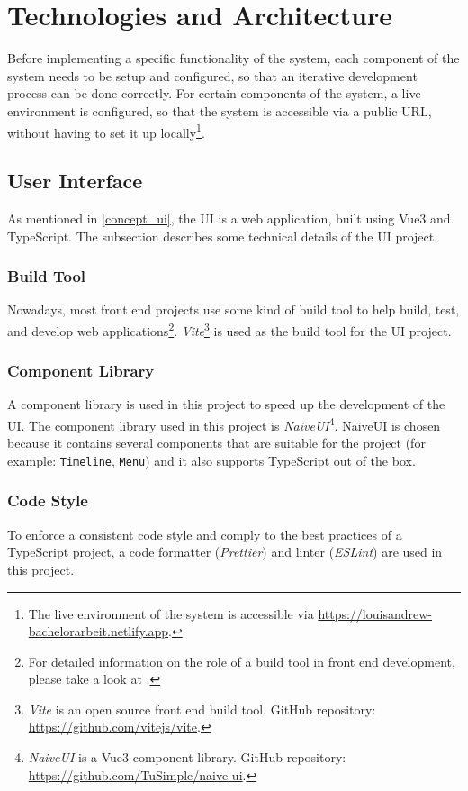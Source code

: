 \section{Technologies and Architecture}

Before implementing a specific functionality of the system, each component of the system needs to be setup and configured, so that an iterative development process can be done correctly. For certain components of the system, a live environment is configured, so that the system is accessible via a public URL, without having to set it up locally\footnote{The live environment of the system is accessible via \url{https://louisandrew-bachelorarbeit.netlify.app}.}. 

 \subsection{User Interface}

    As mentioned in \autoref{concept_ui}, the UI is a web application, built using Vue3 and TypeScript. The subsection describes some technical details of the UI project. 

  \subsubsection{Build Tool}
   Nowadays, most front end projects use some kind of build tool to help build, test, and develop web applications\footnote{For detailed information on the role of a build tool in front end development, please take a look at \autocite{Odell2014}.}. \emph{Vite}\footnote{\emph{Vite} is an open source front end build tool. GitHub repository: \url{https://github.com/vitejs/vite}.} is used as the build tool for the UI project.

  \subsubsection{Component Library}
  A component library is used in this project to speed up the development of the UI. The component library used in this project is \emph{NaiveUI}\footnote{\emph{NaiveUI} is a Vue3 component library. GitHub repository: \url{https://github.com/TuSimple/naive-ui}.}. NaiveUI is chosen because it contains several components that are suitable for the project (for example: \verb;Timeline;, \verb;Menu;) and it also supports TypeScript out of the box.

  \subsubsection{Code Style}
  To enforce a consistent code style and comply to the best practices of a TypeScript project, a code formatter (\emph{Prettier}) and linter (\emph{ESLint}) are used in this project. 

